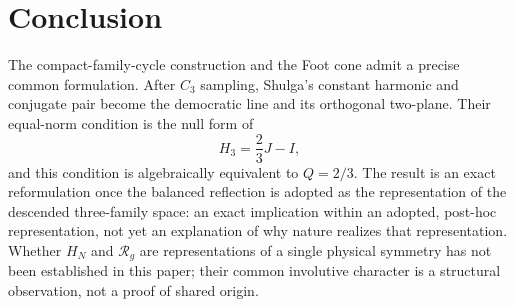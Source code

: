 \documentclass[aps,twocolumn,superscriptaddress,nofootinbib,floatfix]{revtex4-2}
\newcommand{\RR}{\mathcal R}
\begin{document}
\section{Conclusion}

The compact-family-cycle construction and the Foot cone admit a precise common formulation. After $C_3$ sampling, Shulga's constant harmonic and conjugate pair become the democratic line and its orthogonal two-plane. Their equal-norm condition is the null form of
\begin{equation}
H_3=\frac23J-I,
\end{equation}
and this condition is algebraically equivalent to $Q=2/3$. The result is an exact reformulation once the balanced reflection is adopted as the representation of the descended three-family space: an exact implication within an adopted, post-hoc representation, not yet an explanation of why nature realizes that representation. Whether $H_N$ and $\RR_g$ are representations of a single physical symmetry has not been established in this paper; their common involutive character is a structural observation, not a proof of shared origin.
\end{document}
